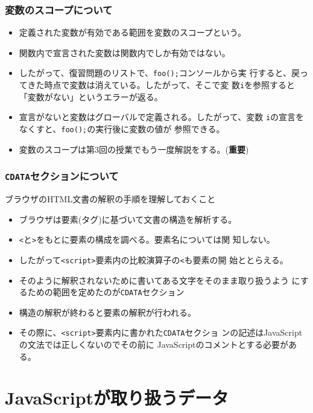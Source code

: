 \begin{frame}[containsverbatim]
 \frametitle{変数のスコープについて}
\begin{itemize}
 \item 定義された変数が有効である範囲を変数のスコープという。
 \item 関数内で宣言された変数は関数内でしか有効ではない。
 \item したがって、復習問題のリストで、\texttt{foo();}コンソールから実
       行すると、戻ってきた時点で変数は消えている。したがって、そこで変
       数\texttt{i}を参照すると「変数がない」というエラーが返る。
 \item 宣言がないと変数はグローバルで定義される。したがって、変数
       \texttt{i}の宣言をなくすと、\texttt{foo();}の実行後に変数の値が
       参照できる。
 \item 変数のスコープは第3回の授業でもう一度解説をする。({\bfseries 重要})
\end{itemize} 
\end{frame}
\begin{frame}[containsverbatim]
 \frametitle{\texttt{CDATA}セクションについて}
 ブラウザのHTML文書の解釈の手順を理解しておくこと
 \begin{itemize}
  \item ブラウザは要素(タグ)に基づいて文書の構造を解析する。
  \item \Verb+<+と\Verb+>+をもとに要素の構成を調べる。要素名については関
        知しない。
  \item したがって\Verb+<script>+要素内の比較演算子の\Verb+<+も要素の開
        始ととらえる。
  \item そのように解釈されないために書いてある文字をそのまま取り扱うよう
        にするための範囲を定めたのが\texttt{CDATA}セクション
  \item 構造の解釈が終わると要素の解釈が行われる。
  \item その際に、\Verb+<script>+要素内に書かれた\texttt{CDATA}セクショ
        ンの記述はJavaScriptの文法では正しくないのでその前に
        JavaScriptのコメントとする必要がある。
 \end{itemize}
\end{frame}
\section{JavaScriptが取り扱うデータ}
